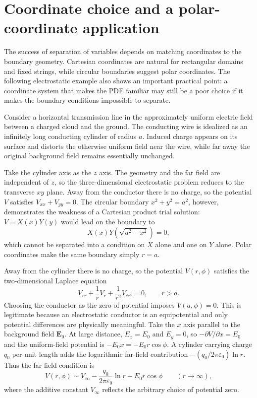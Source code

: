\section{Coordinate choice and a polar-coordinate application}

The success of separation of variables depends on matching coordinates to the boundary geometry. Cartesian coordinates are natural for rectangular domains and fixed strings, while circular boundaries suggest polar coordinates. The following electrostatic example also shows an important practical point: a coordinate system that makes the PDE familiar may still be a poor choice if it makes the boundary conditions impossible to separate.

Consider a horizontal transmission line in the approximately uniform electric field between a charged cloud and the ground. The conducting wire is idealized as an infinitely long conducting cylinder of radius $a$. Induced charge appears on its surface and distorts the otherwise uniform field near the wire, while far away the original background field remains essentially unchanged.

Take the cylinder axis as the $z$ axis. The geometry and the far field are independent of $z$, so the three-dimensional electrostatic problem reduces to the transverse $xy$ plane. Away from the conductor there is no charge, so the potential $V$ satisfies $V_{xx}+V_{yy}=0$. The circular boundary $x^2+y^2=a^2$, however, demonstrates the weakness of a Cartesian product trial solution: $V=X(x)Y(y)$ would lead on the boundary to
\begin{equation}
X(x)Y\left(\sqrt{a^2-x^2}\right)=0,
\end{equation}
which cannot be separated into a condition on $X$ alone and one on $Y$ alone. Polar coordinates make the same boundary simply $r=a$.

Away from the cylinder there is no charge, so the potential $V(r,\phi)$ satisfies the two-dimensional Laplace equation
\begin{equation}
V_{rr}+\frac{1}{r}V_r+\frac{1}{r^2}V_{\phi\phi}=0,
\qquad r>a.
\label{eq:ch04-polar-laplace}
\end{equation}
Choosing the conductor as the zero of potential imposes $V(a,\phi)=0$. This is legitimate because an electrostatic conductor is an equipotential and only potential differences are physically meaningful. Take the $x$ axis parallel to the background field $\mathbf{E}_0$. At large distance, $E_x=E_0$ and $E_y=0$, so $-\partial V/\partial x=E_0$ and the uniform-field potential is $-E_0x=-E_0r\cos\phi$. A cylinder carrying charge $q_0$ per unit length adds the logarithmic far-field contribution $-(q_0/2\pi\varepsilon_0)\ln r$. Thus the far-field condition is
\begin{equation}
V(r,\phi)\sim V_\infty-
\frac{q_0}{2\pi\varepsilon_0}\ln r-E_0r\cos\phi
\qquad (r\to\infty),
\end{equation}
where the additive constant $V_\infty$ reflects the arbitrary choice of potential zero.

